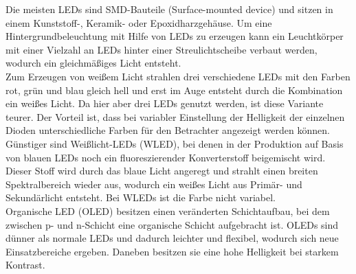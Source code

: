 Die meisten LEDs sind SMD-Bauteile (Surface-mounted device) und sitzen in einem Kunststoff-, Keramik- oder Epoxidharzgehäuse. 
Um eine Hintergrundbeleuchtung mit Hilfe von LEDs zu erzeugen kann ein Leuchtkörper mit einer Vielzahl an LEDs hinter einer Streulichtscheibe verbaut werden, wodurch ein gleichmäßiges Licht entsteht. \cite[Vgl. Seite 194]{LofflerMang.2020} \\
Zum Erzeugen von weißem Licht strahlen drei verschiedene LEDs mit den Farben rot, grün und blau gleich hell und erst im Auge entsteht durch die Kombination ein weißes Licht. Da hier aber drei LEDs genutzt werden, ist diese Variante teurer. Der Vorteil ist, dass bei variabler Einstellung der Helligkeit der einzelnen Dioden unterschiedliche Farben für den Betrachter angezeigt werden können. \\ 
Günstiger sind Weißlicht-LEDs (WLED), bei denen in der Produktion auf Basis von blauen LEDs noch ein fluoreszierender Konverterstoff beigemischt wird. Dieser Stoff wird durch das blaue Licht angeregt und strahlt einen breiten Spektralbereich wieder aus, wodurch ein weißes Licht aus Primär- und Sekundärlicht entsteht. Bei WLEDs ist die Farbe nicht variabel. \cite[Vgl. Seite 194]{LofflerMang.2020} \\
Organische LED (OLED) besitzen einen veränderten Schichtaufbau, bei dem zwischen p- und n-Schicht eine organische Schicht aufgebracht ist. OLEDs sind dünner als normale LEDs und dadurch leichter und flexibel, wodurch sich neue Einsatzbereiche ergeben. Daneben besitzen sie eine hohe Helligkeit bei starkem Kontrast. \cite[Vgl. Seite 195]{LofflerMang.2020}
